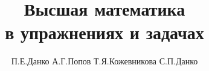 
\title{Высшая математика\\в упражнениях и задачах}
\author{П.Е.Данко А.Г.Попов Т.Я.Кожевникова С.П.Данко}

\maketitle
\tableofcontents



